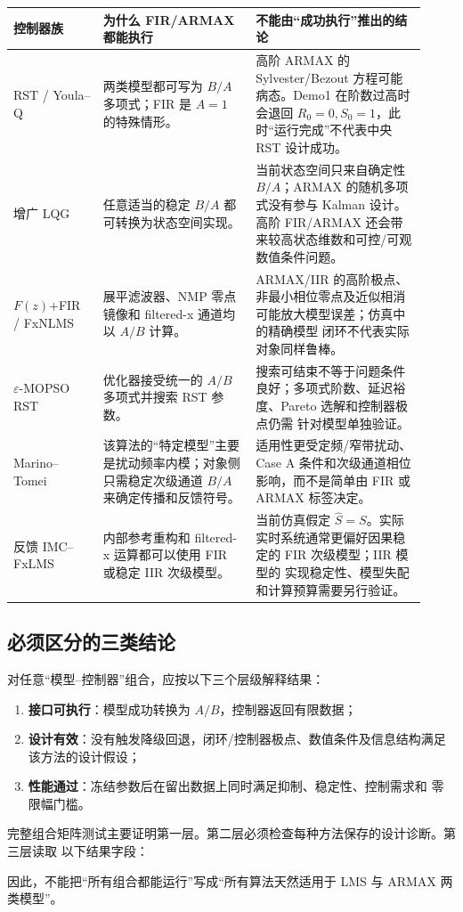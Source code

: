 \documentclass[UTF8,11pt,a4paper]{ctexart}
\begin{document}
\begin{longtable}{p{0.20\linewidth}p{0.34\linewidth}p{0.38\linewidth}}
\toprule
控制器族 & 为什么 FIR/ARMAX 都能执行 & 不能由“成功执行”推出的结论\\
\midrule
\endhead
RST / Youla--Q & 两类模型都可写为 $B/A$ 多项式；FIR 是 $A=1$ 的特殊情形。 &
高阶 ARMAX 的 Sylvester/Bezout 方程可能病态。Demo1 在阶数过高时会退回
$R_0=0,S_0=1$，此时“运行完成”不代表中央 RST 设计成功。\\

增广 LQG & 任意适当的稳定 $B/A$ 都可转换为状态空间实现。 &
当前状态空间只来自确定性 $B/A$；ARMAX 的随机多项式没有参与 Kalman 设计。
高阶 FIR/ARMAX 还会带来较高状态维数和可控/可观数值条件问题。\\

$F(z)$+FIR / FxNLMS & 展平滤波器、NMP 零点镜像和 filtered-x 通道均以 $A/B$ 计算。 &
ARMAX/IIR 的高阶极点、非最小相位零点及近似相消可能放大模型误差；仿真中的精确模型
闭环不代表实际对象同样鲁棒。\\

$\varepsilon$-MOPSO RST & 优化器接受统一的 $A/B$ 多项式并搜索 RST 参数。 &
搜索可结束不等于问题条件良好；多项式阶数、延迟裕度、Pareto 选解和控制器极点仍需
针对模型单独验证。\\

Marino--Tomei & 该算法的“特定模型”主要是扰动频率内模；对象侧只需稳定次级通道
$B/A$ 来确定传播和反馈符号。 &
适用性更受定频/窄带扰动、Case A 条件和次级通道相位影响，而不是简单由 FIR 或 ARMAX
标签决定。\\

反馈 IMC--FxLMS & 内部参考重构和 filtered-x 运算都可以使用 FIR 或稳定 IIR 次级模型。 &
当前仿真假定 $\hat S=S$。实际实时系统通常更偏好因果稳定的 FIR 次级模型；IIR 模型的
实现稳定性、模型失配和计算预算需要另行验证。\\
\bottomrule
\end{longtable}

\subsection{必须区分的三类结论}

对任意“模型--控制器”组合，应按以下三个层级解释结果：
\begin{enumerate}
  \item \textbf{接口可执行}：模型成功转换为 $A/B$，控制器返回有限数据；
  \item \textbf{设计有效}：没有触发降级回退，闭环/控制器极点、数值条件及信息结构满足
        该方法的设计假设；
  \item \textbf{性能通过}：冻结参数后在留出数据上同时满足抑制、稳定性、控制需求和
        零限幅门槛。
\end{enumerate}
完整组合矩阵测试主要证明第一层。第二层必须检查每种方法保存的设计诊断。第三层读取
以下结果字段：
\begin{center}
\end{center}
因此，不能把“所有组合都能运行”写成“所有算法天然适用于 LMS 与 ARMAX 两类模型”。
\end{document}
